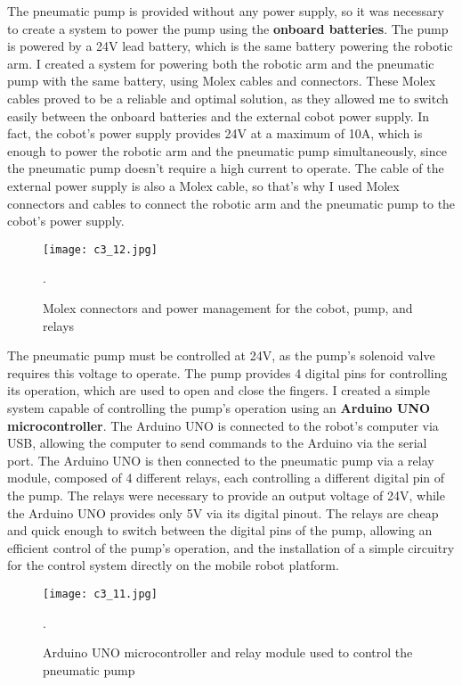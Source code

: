 The pneumatic pump is provided without any power supply, so it was necessary to create a system to power the pump
using the \textbf{onboard batteries}. The pump is powered by a 24V lead battery, which is the same battery powering
the robotic arm. I created a system for powering both the robotic arm and the pneumatic pump with the same battery,
using Molex cables and connectors. These Molex cables proved to be a reliable and optimal solution,
as they allowed me to switch easily between the onboard batteries and the external cobot power supply.
In fact, the cobot's power supply provides 24V at a maximum of 10A, which is enough to power the robotic arm
and the pneumatic pump simultaneously, since the pneumatic pump doesn't require a high current to operate.
The cable of the external power supply is also a Molex cable, so that's why I used Molex connectors and cables
to connect the robotic arm and the pneumatic pump to the cobot's power supply.

\begin{figure}[t]
    \centering
    \texttt{[image: c3\_12.jpg]}
    \captionsetup{width=1\linewidth}
    \caption{Molex connectors and power management for the cobot, pump, and relays}.
    \label{fig:c3_img12}
\end{figure}

The pneumatic pump must be controlled at 24V, as the pump's solenoid valve requires this voltage to operate.
The pump provides 4 digital pins for controlling its operation, which are used to open and close the fingers.
I created a simple system capable of controlling the pump's operation using an \textbf{Arduino UNO microcontroller}.
The Arduino UNO is connected to the robot's computer via USB, allowing the computer to send commands to the Arduino
via the serial port. The Arduino UNO is then connected to the pneumatic pump via a relay module,
composed of 4 different relays, each controlling a different digital pin of the pump. The relays were necessary
to provide an output voltage of 24V, while the Arduino UNO provides only 5V via its digital pinout.
The relays are cheap and quick enough to switch between the digital pins of the pump, allowing an efficient
control of the pump's operation, and the installation of a simple circuitry for the control system 
directly on the mobile robot platform.

\begin{figure}[t]
    \centering
    \texttt{[image: c3\_11.jpg]}
    \captionsetup{width=1\linewidth}
    \caption{Arduino UNO microcontroller and relay module used to control the pneumatic pump}.
    \label{fig:c3_img10}
\end{figure}

